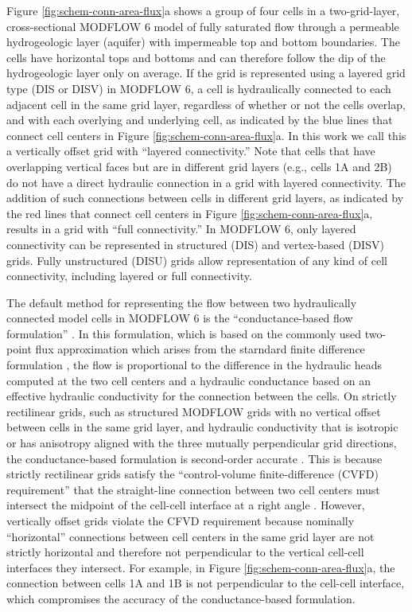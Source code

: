 \documentclass{article}
\begin{document}
Figure \ref{fig:schem-conn-area-flux}a shows a group of four cells in a two-grid-layer, cross-sectional MODFLOW 6 model of fully saturated flow through a permeable hydrogeologic layer (aquifer) with impermeable top and bottom boundaries. The cells have horizontal tops and bottoms and can therefore follow the dip of the hydrogeologic layer only on average. If the grid is represented using a layered grid type (DIS or DISV) in MODFLOW 6, a cell is hydraulically connected to each adjacent cell in the same grid layer, regardless of whether or not the cells overlap, and with each overlying and underlying cell, as indicated by the blue lines that connect cell centers in Figure \ref{fig:schem-conn-area-flux}a. In this work we call this a vertically offset grid with ``layered connectivity.''  Note that cells that have overlapping vertical faces but are in different grid layers (e.g., cells 1A and 2B) do not have a direct hydraulic connection in a grid with layered connectivity. The addition of such connections between cells in different grid layers, as indicated by the red lines that connect cell centers in Figure \ref{fig:schem-conn-area-flux}a, results in a grid with ``full connectivity.''  In MODFLOW 6, only layered connectivity can be represented in structured (DIS) and vertex-based (DISV) grids. Fully unstructured (DISU) grids allow representation of any kind of cell connectivity, including layered or full connectivity.

The default method for representing the flow between two hydraulically connected model cells in MODFLOW 6 is the ``conductance-based flow formulation'' \citep{modflow6gwf}. In this formulation, which is based on the commonly used two-point flux approximation which arises from the starndard finite difference formulation \citep{modflow84}, the flow is proportional to the difference in the hydraulic heads computed at the two cell centers and a hydraulic conductance based on an effective hydraulic conductivity for the connection between the cells. On strictly rectilinear grids, such as structured MODFLOW grids with no vertical offset between cells in the same grid layer, and hydraulic conductivity that is isotropic or has anisotropy aligned with the three mutually perpendicular grid directions, the conductance-based formulation is second-order accurate \citep{dehotin2010modeling, modflow6gwf}. This is because strictly rectilinear grids satisfy the ``control-volume finite-difference (CVFD) requirement'' that the straight-line connection between two cell centers must intersect the midpoint of the cell-cell interface at a right angle \citep{narasimhan1976integrated}. However, vertically offset grids violate the CFVD requirement because nominally ``horizontal'' connections between cell centers in the same grid layer are not strictly horizontal and therefore not perpendicular to the vertical cell-cell interfaces they intersect. For example, in Figure \ref{fig:schem-conn-area-flux}a, the connection between cells 1A and 1B is not perpendicular to the cell-cell interface, which compromises the accuracy of the conductance-based formulation.
\end{document}
